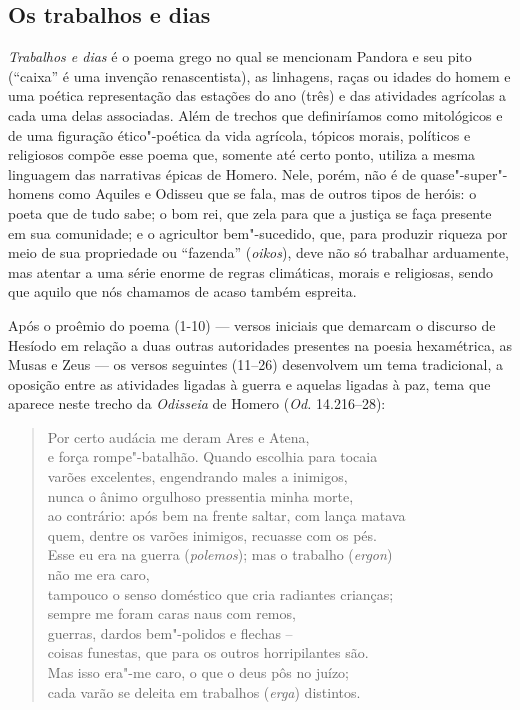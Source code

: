 \subsection{Os trabalhos e dias}

\emph{Trabalhos e dias} é o poema grego no qual se mencionam Pandora e
seu pito (``caixa'' é uma invenção renascentista), as linhagens, raças
ou idades do homem e uma poética representação das estações do ano
(três) e das atividades agrícolas a cada uma delas associadas. Além de
trechos que definiríamos como mitológicos e de uma figuração
ético"-poética da vida agrícola, tópicos morais, políticos e religiosos
compõe esse poema que, somente até certo ponto, utiliza a mesma linguagem das
narrativas épicas de Homero. Nele, porém, não é de quase"-super"-homens
como Aquiles e Odisseu que se fala, mas de outros tipos de heróis: o
poeta que de tudo sabe; o bom rei, que zela para que a justiça se faça
presente em sua comunidade; e o agricultor bem"-sucedido, que, para
produzir riqueza por meio de sua propriedade ou ``fazenda''
(\emph{oikos}), deve não só trabalhar arduamente, mas atentar a uma
série enorme de regras climáticas, morais e religiosas, sendo que aquilo
que nós chamamos de acaso também espreita.

Após o proêmio do poema (1-10) --- versos iniciais que demarcam o discurso de Hesíodo em relação a duas outras autoridades presentes na poesia hexamétrica, as Musas e Zeus --- os versos seguintes (11--26) desenvolvem um tema
tradicional, a oposição entre as atividades ligadas à guerra e aquelas
ligadas à paz, tema que aparece neste trecho da \emph{Odisseia} de
Homero (\emph{Od.} 14.216--28):

\begin{verse}
Por certo audácia me deram Ares e Atena,\\
e força rompe"-batalhão. Quando escolhia para tocaia\\
varões excelentes, engendrando males a inimigos,\\
nunca o ânimo orgulhoso pressentia minha morte,\\
ao contrário: após bem na frente saltar, com lança matava\\
quem, dentre os varões inimigos, recuasse com os pés.\\
Esse eu era na guerra (\emph{polemos}); mas o trabalho (\emph{ergon})\\
não me era caro,\\
tampouco o senso doméstico que cria radiantes crianças;\\
sempre me foram caras naus com remos,\\
guerras, dardos bem"-polidos e flechas --\\
coisas funestas, que para os outros horripilantes são.\\
Mas isso era"-me caro, o que o deus pôs no juízo;\\
cada varão se deleita em trabalhos (\emph{erga}) distintos.
\end{verse}

